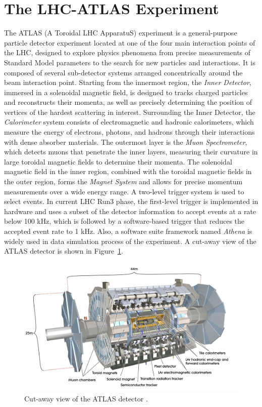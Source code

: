 \section{The LHC-ATLAS Experiment} \label{ATLAS}
The ATLAS (A Toroidal LHC ApparatuS) experiment is a general-purpose particle detector experiment located at one of the four main interaction points of the LHC, designed to explore physics phenomena from precise measurements of Standard Model parameters to the search for new particles and interactions. It is composed of several sub-detector systems arranged concentrically around the beam interaction point. Starting from the innermost region, the \textit{Inner Detector}, immersed in a solenoidal magnetic field, is designed to tracks charged particles and reconstructs their momenta, as well as precisely determining the position of vertices of the hardest scattering in interest. Surrounding the Inner Detector, the \textit{Calorimeter} system consists of electromagnetic and hadronic calorimeters, which measure the energy of electrons, photons, and hadrons through their interactions with dense absorber materials. The outermost layer is the \textit{Muon Spectrometer}, which detects muons that penetrate the inner layers, measuring their curvature in large toroidal magnetic fields to determine their momenta. The solenoidal magnetic field in the inner region, combined with the toroidal magnetic fields in the outer region, forms the \textit{Magnet System} and allows for precise momentum measurements over a wide energy range. A two-level trigger system is used to select events. In current LHC Run3 phase, the first-level trigger is implemented in hardware and uses a subset of the detector information to accept events at a rate below 100 kHz, which is followed by a software-based trigger that reduces the accepted event rate to 1 kHz. Also, a software suite framework named \textit{Athena} is widely used in data simulation process of the experiment.
A cut-away view of the ATLAS detector is shown in Figure~\ref{fig:ATLASDetector}.
\begin{figure}[htbp]
  \centering
  \includegraphics[width=1.0\textwidth]{figs/chapter1/ATLAS.png}
  \caption{Cut-away view of the ATLAS detector \cite{ATLASDetector2008}.}
  \label{fig:ATLASDetector}
\end{figure}
